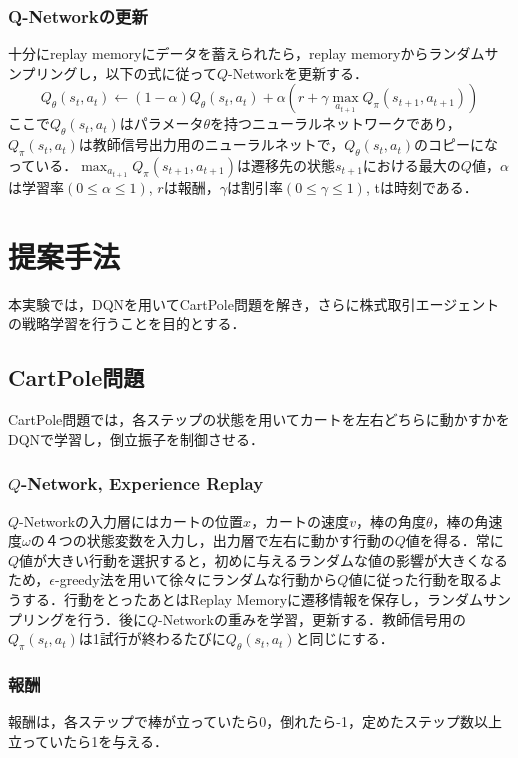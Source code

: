 \documentclass[twocolumn]{jarticle}
\begin{document}
        \subsubsection{Q-Networkの更新}
        十分にreplay memoryにデータを蓄えられたら，replay memoryからランダムサンプリングし，以下の式に従って$Q$-Networkを更新する．
        \begin{equation}
            Q_\theta(s_t,a_t)\leftarrow(1-\alpha)Q_\theta(s_t,a_t)+\alpha(r+\gamma\max_{a_{t+1}}Q_\pi(s_{t+1},a_{t+1}))
        \end{equation}
        ここで$Q_\theta(s_t,a_t)$はパラメータ$\theta$を持つニューラルネットワークであり，$Q_\pi(s_t,a_t)$は教師信号出力用のニューラルネットで，$Q_\theta(s_t,a_t)$のコピーになっている．$\max_{a_{t+1}}Q_\pi(s_{t+1},a_{t+1})$は遷移先の状態$s_{t+1}$における最大の$Q$値，$\alpha$は学習率$(0\leq \alpha\leq 1)$, $r$は報酬，$\gamma$は割引率$(0\leq \gamma\leq 1)$, tは時刻である．


\section{提案手法}
本実験では，DQNを用いてCartPole問題を解き，さらに株式取引エージェントの戦略学習を行うことを目的とする．
    \subsection{CartPole問題}
        CartPole問題では，各ステップの状態を用いてカートを左右どちらに動かすかをDQNで学習し，倒立振子を制御させる．
        \subsubsection{$Q$-Network, Experience Replay}
        $Q$-Networkの入力層にはカートの位置$x$，カートの速度$v$，棒の角度$\theta$，棒の角速度$\omega$の４つの状態変数を入力し，出力層で左右に動かす行動の$Q$値を得る．常に$Q$値が大きい行動を選択すると，初めに与えるランダムな値の影響が大きくなるため，$\epsilon$-greedy法を用いて徐々にランダムな行動から$Q$値に従った行動を取るようする．行動をとったあとはReplay Memoryに遷移情報を保存し，ランダムサンプリングを行う．後に$Q$-Networkの重みを学習，更新する．教師信号用の$Q_\pi(s_t,a_t)$は1試行が終わるたびに$Q_\theta(s_t,a_t)$と同じにする．
        \subsubsection{報酬}
        報酬は，各ステップで棒が立っていたら0，倒れたら-1，定めたステップ数以上立っていたら1を与える．
\end{document}
